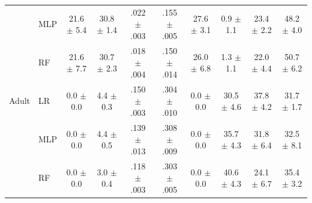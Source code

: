 \begin{table}[t]
\begin{tabular}{ll cccc c ccc}
 & MLP & 21.6 $\pm$ 5.4 & 30.8 $\pm$ 1.4 & .022 $\pm$ .003 & .155 $\pm$ .005 & 27.6 $\pm$ 3.1 & 0.9 $\pm$ 1.1 & 23.4 $\pm$ 2.2 & 48.2 $\pm$ 4.0 \\
 & RF & 21.6 $\pm$ 7.7 & 30.7 $\pm$ 2.3 & .018 $\pm$ .004 & .150 $\pm$ .014 & 26.0 $\pm$ 6.8 & 1.3 $\pm$ 1.1 & 22.0 $\pm$ 4.4 & 50.7 $\pm$ 6.2 \\
\hline
Adult & LR & 0.0 $\pm$ 0.0 & 4.4 $\pm$ 0.3 & .150 $\pm$ .003 & .304 $\pm$ .010 & 0.0 $\pm$ 0.0 & 30.5 $\pm$ 4.6 & 37.8 $\pm$ 4.2 & 31.7 $\pm$ 1.7 \\
 & MLP & 0.0 $\pm$ 0.0 & 4.4 $\pm$ 0.5 & .139 $\pm$ .013 & .308 $\pm$ .009 & 0.0 $\pm$ 0.0 & 35.7 $\pm$ 4.3 & 31.8 $\pm$ 6.4 & 32.5 $\pm$ 8.1 \\
 & RF & 0.0 $\pm$ 0.0 & 3.0 $\pm$ 0.4 & .118 $\pm$ .003 & .303 $\pm$ .005 & 0.0 $\pm$ 0.0 & 40.6 $\pm$ 4.3 & 24.1 $\pm$ 6.7 & 35.4 $\pm$ 3.2 \\
\hline
\end{tabular}
\end{table}

